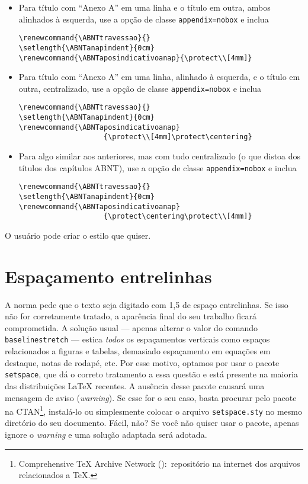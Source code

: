 \documentclass[espaco=simples,appendix=Name]{abnt}
\newcommand{\abnt}{{\smaller ABNT}}%
\newcommand{\bs}{\symbol{92}}   %
\newcommand{\ingles}[1]{\textsl{#1}}
\begin{document}
\begin{itemize}
\item Para título com ``Anexo A'' em uma linha e o título em outra,
  ambos alinhados à esquerda, use a opção de classe
  \texttt{appendix=nobox} e inclua 
\begin{verbatim}
\renewcommand{\ABNTtravessao}{}
\setlength{\ABNTanapindent}{0cm}
\renewcommand{\ABNTaposindicativoanap}{\protect\\[4mm]}
\end{verbatim}

\item Para título com ``Anexo A'' em uma linha, alinhado à esquerda, e o
  título em outra, centralizado, use a opção de classe
  \texttt{appendix=nobox} e inclua 
\begin{verbatim}
\renewcommand{\ABNTtravessao}{}
\setlength{\ABNTanapindent}{0cm}
\renewcommand{\ABNTaposindicativoanap}
                    {\protect\\[4mm]\protect\centering}
\end{verbatim}
\item Para algo similar aos anteriores, mas com tudo centralizado (o que
  distoa dos títulos dos capítulos \abnt{}), use a opção de classe
  \texttt{appendix=nobox} e inclua 
\begin{verbatim}
\renewcommand{\ABNTtravessao}{}
\setlength{\ABNTanapindent}{0cm}
\renewcommand{\ABNTaposindicativoanap}
                    {\protect\centering\protect\\[4mm]}
\end{verbatim}

\end{itemize}

O usuário pode criar o estilo que quiser.

\section{Espaçamento entrelinhas}\label{subsec: espacamento entrelinhas}

A norma pede que o texto seja digitado com {1,5} de  espaço entrelinhas. Se 
isso não for corretamente tratado, a aparência final do seu trabalho ficará
comprometida. A solução usual --- apenas alterar o valor do comando
\texttt{\bs baselinestretch} --- estica \emph{todos} os espaçamentos
verticais como espaços relacionados a figuras e tabelas, demasiado
espaçamento em equações em destaque, notas de rodapé, etc. Por esse motivo,
optamos por usar o pacote \texttt{setspace}, que dá o correto tratamento a
essa questão e está presente na maioria das distribuições \LaTeX{} recentes. 
A ausência desse pacote causará uma mensagem de aviso
(\negthinspace\ingles{warning}). Se esse for o seu caso, basta procurar
pelo pacote na CTAN\footnote{Comprehensive \TeX{} Archive Network
  ():\
  repositório na internet dos arquivos relacionados a \TeX.}, instalá-lo ou
simplesmente colocar o arquivo \texttt{setspace.sty} no mesmo diretório do
seu documento. Fácil, não? Se você não quiser usar o pacote, apenas ignore
o \ingles{warning} e uma solução adaptada será adotada.
\end{document}
